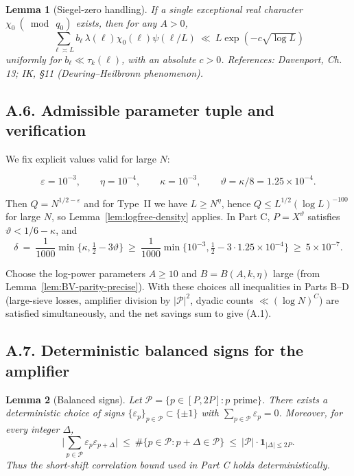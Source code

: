 \documentclass[11pt]{article}
\newtheorem{lemma}{Lemma}[section]
\theoremstyle{definition}
\theoremstyle{remark}
\begin{document}
\begin{lemma}[Siegel-zero handling]\label{lem:siegel}
If a single exceptional real character $\chi_0\ (\bmod\ q_0)$ exists, then for any $A>0$,
\[
\sum_{\ell\asymp L} b_\ell\,\lambda(\ell)\chi_0(\ell)\psi(\ell/L)\ \ll\ L\exp(-c\sqrt{\log L})
\]
uniformly for $b_\ell\ll \tau_k(\ell)$, with an absolute $c>0$. References: Davenport, Ch. 13; IK, §11 (Deuring--Heilbronn phenomenon).
\end{lemma}

\subsection*{A.6. Admissible parameter tuple and verification}

We fix explicit values valid for large $N$:

\[
\varepsilon=10^{-3},\qquad \eta=10^{-4},\qquad \kappa=10^{-3},\qquad \vartheta=\kappa/8=1.25\times 10^{-4}.
\]

Then $Q=N^{1/2-\varepsilon}$ and for Type~II we have $L\ge N^{\eta}$, hence $Q\le L^{1/2}(\log L)^{-100}$ for large $N$, so Lemma~\ref{lem:logfree-density} applies. In Part C, $P=X^{\vartheta}$ satisfies $\vartheta<1/6-\kappa$, and
\[
\delta\ =\ \frac1{1000}\min\{\kappa,\tfrac12-3\vartheta\}\ \ge\ \frac{1}{1000}\min\{10^{-3},\tfrac12-3\cdot 1.25\times 10^{-4}\}\ \ge\ 5\times 10^{-7}.
\]

Choose the log-power parameters $A\ge 10$ and $B=B(A,k,\eta)$ large (from Lemma~\ref{lem:BV-parity-precise}). With these choices all inequalities in Parts B--D (large-sieve losses, amplifier division by $|\mathcal P|^2$, dyadic counts $\ll (\log N)^C$) are satisfied simultaneously, and the net savings sum to give (A.1).

\subsection*{A.7. Deterministic balanced signs for the amplifier}

\begin{lemma}[Balanced signs]\label{lem:balanced-signs}
Let $\mathcal P=\{p\in[P,2P]: p\text{ prime}\}$. There exists a deterministic choice of signs $\{\varepsilon_p\}_{p\in\mathcal P}\subset\{\pm 1\}$ with $\sum_{p\in\mathcal P}\varepsilon_p=0$. Moreover, for every integer $\Delta$, 
\[
\Big|\sum_{p\in\mathcal P}\varepsilon_p\varepsilon_{p+\Delta}\Big|\ \le\ \#\{p\in\mathcal P: p+\Delta\in\mathcal P\}\ \le\ |\mathcal P|\cdot \mathbf 1_{|\Delta|\le 2P}.
\]
Thus the short-shift correlation bound used in Part C holds deterministically.
\end{lemma}
\end{document}
